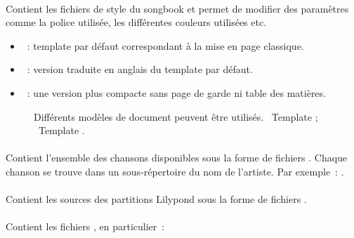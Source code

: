 \paragraph{}
Contient les fichiers de style du songbook et permet de modifier des
paramètres comme la police utilisée, les différentes couleurs
utilisées etc.

\begin{itemize}
\item {}~: template par défaut correspondant à la
  mise en page classique.
\item {}~: version traduite en anglais du
  template par défaut.
\item {}~: une version plus compacte sans page de
  garde ni table des matières.
\end{itemize}

\begin{figure}
  \centering
  \hspace{0.1cm}%
  \caption[Templates]{%
    Différents modèles de document peuvent être utilisés.
    ~Template ; %
    ~Template .%
  }%
  \label{fig:templates}
\end{figure}


\paragraph{}
Contient l'ensemble des chansons disponibles sous la forme de fichiers
. Chaque chanson se trouve dans un sous-répertoire du nom
de l'artiste. Par exemple~:
.

\paragraph{}
Contient les sources des partitions Lilypond sous la forme de fichiers
.

\paragraph{}
Contient les fichiers \latex, en particulier~:

